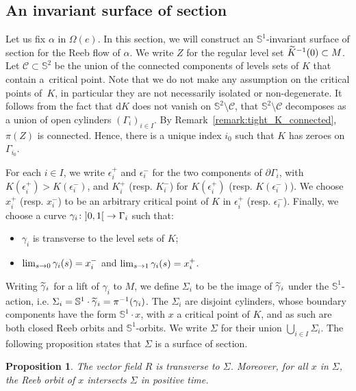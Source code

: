 \documentclass[10pt,a4paper]{amsart}
\newcommand{\bbS}{\mathbb{S}}
\newcommand{\clC}{\mathcal{C}}
\newcommand{\rmd}{\mathrm{d}}
\renewcommand*{\to}{\mathchoice{\longrightarrow}{\rightarrow}{\rightarrow}{\rightarrow}}
\let\oldtilde\tilde
\renewcommand*{\tilde}[1]{\mathchoice{\widetilde{#1}}{\widetilde{#1}}{\oldtilde{#1}}{\oldtilde{#1}}}
\newtheorem{prop}[theo]{Proposition}
\theoremstyle{definition}\newtheorem{defi}[theo]{Definition}
\begin{document}
\subsection{An invariant surface of section}\label{sub:invariant_surface_of_section}
Let us fix $\alpha$ in $\Omega(e)$. In this section, we will construct an $\bbS^1$-invariant surface of section for the Reeb flow of $\alpha$. We write $Z$ for the regular level set $\tilde K^{-1}(0) \subset M$. Let $\clC \subset \bbS^2$ be the union of the connected components of levels sets of $K$ that contain a~critical point. Note that we do not make any assumption on the critical points of~$K$, in particular they are not necessarily isolated or non-degenerate. It follows from the fact that $\rmd K$ does not vanish on $\bbS^2 \setminus \clC$, that $\bbS^2 \setminus \clC$ decomposes as a union of open cylinders $(\Gamma_i)_{i \in I}$. By Remark~\ref{remark:tight_K_connected}, $\pi(Z)$ is connected. Hence, there is a unique index $i_0$ such that $K$ has zeroes on $\Gamma_{i_0}$.

For each $i \in I$, we write $\epsilon_i^+$ and $\epsilon_i^-$ for the two components of $\partial \Gamma_i$, with $K(\epsilon_i^+) > K(\epsilon_i^-)$, and $K_i^+$ (resp. $K_i^-$) for $K(\epsilon_i^+)$ (resp. $K(\epsilon_i^-)$). We choose $x_i^+$ (resp. $x_i^-$) to be an arbitrary critical point of $K$ in $\epsilon_i^+$ (resp. $\epsilon_i^-$). Finally, we choose a curve $\gamma_i \colon\mathopen{]}0,1\mathclose{[}\to \Gamma_i$ such that:
\begin{itemize}
\item $\gamma_i$ is transverse to the level sets of $K$;
\item $\lim_{s \to 0}\gamma_i(s) = x_i^-$ and $\lim_{s \to 1}\gamma_i(s) = x_i^+$.
\end{itemize}


Writing $\tilde \gamma_i$ for a lift of $\gamma_i$ to $M$, we define $\Sigma_i$ to be the image of $\tilde \gamma_i$ under the $\bbS^1$-action, i.e. $\Sigma_i = \bbS^1\cdot \tilde \gamma_i = \pi^{-1}(\gamma_i)$. The $\Sigma_i$ are disjoint cylinders, whose boundary components have the form $\bbS^1 \cdot x$, with $x$ a critical point of $K$, and as such are both closed Reeb orbits and $\bbS^1$-orbits. We write $\Sigma$ for their union $\bigcup_{i \in I} \Sigma_i$. The following proposition states that $\Sigma$ is a surface of section.

\begin{prop}\label{prop:temps_de_retour_fini}
The vector field $R$ is transverse to $\Sigma$. Moreover, for all $x$ in $\Sigma$, the Reeb orbit of $x$ intersects $\Sigma$ in positive time.
\end{prop}
\end{document}
